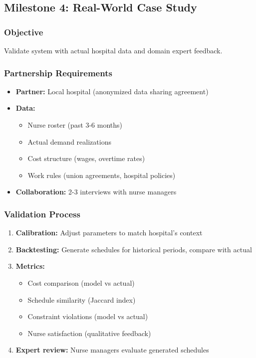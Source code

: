 \documentclass[11pt,letterpaper]{article}
\begin{document}
\subsection{Milestone 4: Real-World Case Study}

\subsubsection{Objective}
Validate system with actual hospital data and domain expert feedback.

\subsubsection{Partnership Requirements}
\begin{itemize}[leftmargin=*]
    \item \textbf{Partner:} Local hospital (anonymized data sharing agreement)
    \item \textbf{Data:}
    \begin{itemize}[leftmargin=*]
        \item Nurse roster (past 3-6 months)
        \item Actual demand realizations
        \item Cost structure (wages, overtime rates)
        \item Work rules (union agreements, hospital policies)
    \end{itemize}
    \item \textbf{Collaboration:} 2-3 interviews with nurse managers
\end{itemize}

\subsubsection{Validation Process}
\begin{enumerate}[leftmargin=*]
    \item \textbf{Calibration:} Adjust parameters to match hospital's context
    \item \textbf{Backtesting:} Generate schedules for historical periods, compare with actual
    \item \textbf{Metrics:}
    \begin{itemize}[leftmargin=*]
        \item Cost comparison (model vs actual)
        \item Schedule similarity (Jaccard index)
        \item Constraint violations (model vs actual)
        \item Nurse satisfaction (qualitative feedback)
    \end{itemize}
    \item \textbf{Expert review:} Nurse managers evaluate generated schedules
\end{enumerate}
\end{document}
